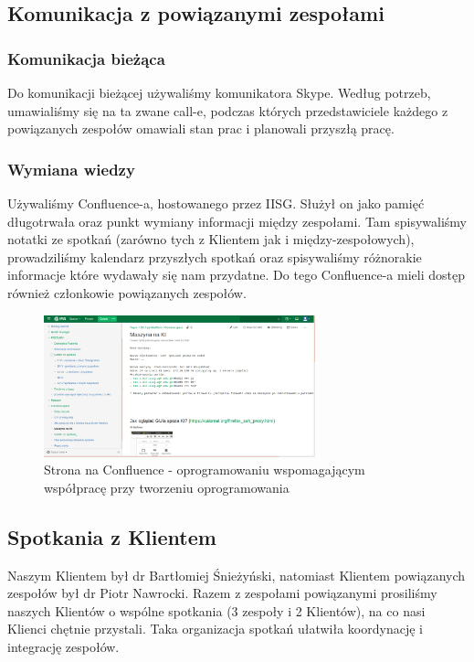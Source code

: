 \documentclass[polish,12pt]{aghthesis}
\begin{document}
\subsection{Komunikacja z powiązanymi zespołami}
\subsubsection{Komunikacja bieżąca}
Do komunikacji bieżącej używaliśmy komunikatora Skype. Według potrzeb, umawialiśmy się na ta zwane call-e, podczas których przedstawiciele każdego z powiązanych zespołów omawiali stan prac i planowali przyszłą pracę.
\subsubsection{Wymiana wiedzy}
Używaliśmy Confluence-a, hostowanego przez IISG. Służył on jako pamięć długotrwała oraz punkt wymiany informacji między zespołami. Tam spisywaliśmy notatki ze spotkań (zarówno tych z Klientem jak i między-zespołowych), prowadziliśmy kalendarz przyszłych spotkań oraz spisywaliśmy różnorakie informacje które wydawały się nam przydatne. Do tego Confluence-a mieli dostęp również członkowie powiązanych zespołów.
 \begin{figure}[H]
    \includegraphics[width=0.7\textwidth]{confluence-maszyna}
    \caption{Strona na Confluence - oprogramowaniu wspomagającym współpracę przy tworzeniu oprogramowania}
    \end{figure}
    
\subsection{Spotkania z Klientem}
Naszym Klientem był dr Bartłomiej Śnieżyński, natomiast Klientem powiązanych zespołów był dr Piotr Nawrocki. Razem z zespołami powiązanymi prosiliśmy naszych Klientów o wspólne spotkania (3 zespoły i 2 Klientów), na co nasi Klienci chętnie przystali. Taka organizacja spotkań ułatwiła koordynację i integrację zespołów.
  
\end{document}
